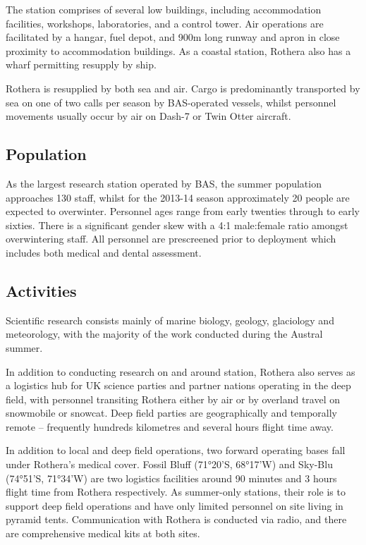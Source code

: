 \documentclass[12pt,a4paper]{article}
\begin{document}
The station comprises of several low buildings, including accommodation facilities, workshops, laboratories, and a control tower. Air operations are facilitated by a hangar, fuel depot, and 900m long runway and apron in close proximity to accommodation buildings. As a coastal station, Rothera also has a wharf permitting resupply by ship.

Rothera is resupplied by both sea and air. Cargo is predominantly transported by sea on one of two calls per season by BAS-operated vessels, whilst personnel movements usually occur by air on Dash-7 or Twin Otter aircraft.

\subsection{Population}

As the largest research station operated by BAS, the summer population approaches 130 staff, whilst for the 2013-14 season approximately 20 people are expected to overwinter. Personnel ages range from early twenties through to early sixties. There is a significant gender skew with a 4:1 male:female ratio amongst overwintering staff. All personnel are prescreened prior to deployment which includes both medical and dental assessment.

\subsection{Activities}

 Scientific research consists mainly of marine biology, geology, glaciology and meteorology, with the majority of the work conducted during the Austral summer.

In addition to conducting research on and around station, Rothera also serves as a logistics hub for UK science parties and partner nations operating in the deep field, with personnel transiting Rothera either by air or by overland travel on snowmobile or snowcat. Deep field parties are geographically and temporally remote -- frequently hundreds kilometres and several hours flight time away.

In addition to local and deep field operations, two forward operating bases fall under Rothera's medical cover. Fossil Bluff (71°20'S, 68°17'W) and Sky-Blu (74°51'S, 71°34'W) are two logistics facilities around 90 minutes and 3 hours flight time from Rothera respectively. As summer-only stations, their role is to support deep field operations and have only limited personnel on site living in pyramid tents. Communication with Rothera is conducted via radio, and there are comprehensive medical kits at both sites.
\end{document}
